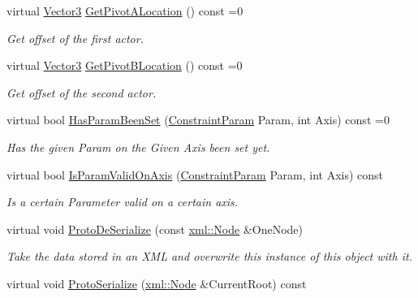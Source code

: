\begin{DoxyCompactItemize}
virtual \hyperlink{classMezzanine_1_1Vector3}{Vector3} \hyperlink{classMezzanine_1_1TypedConstraint_af785319e62e274656f180ab80f5f8dd9}{GetPivotALocation} () const =0
\begin{DoxyCompactList}\small\item\em Get offset of the first actor. \item\end{DoxyCompactList}\item 
virtual \hyperlink{classMezzanine_1_1Vector3}{Vector3} \hyperlink{classMezzanine_1_1TypedConstraint_a2c0984d3211b30756c7ec5263c99b014}{GetPivotBLocation} () const =0
\begin{DoxyCompactList}\small\item\em Get offset of the second actor. \item\end{DoxyCompactList}\item 
virtual bool \hyperlink{classMezzanine_1_1TypedConstraint_a96a6b4c16521f24d72feea98044ef3a8}{HasParamBeenSet} (\hyperlink{namespaceMezzanine_a6c62e8c2938fb203eb7a7072c12176f4}{ConstraintParam} Param, int Axis) const =0
\begin{DoxyCompactList}\small\item\em Has the given Param on the Given Axis been set yet. \item\end{DoxyCompactList}\item 
virtual bool \hyperlink{classMezzanine_1_1TypedConstraint_aeaaffe002055651f3db3e9150fe5a114}{IsParamValidOnAxis} (\hyperlink{namespaceMezzanine_a6c62e8c2938fb203eb7a7072c12176f4}{ConstraintParam} Param, int Axis) const 
\begin{DoxyCompactList}\small\item\em Is a certain Parameter valid on a certain axis. \item\end{DoxyCompactList}\item 
virtual void \hyperlink{classMezzanine_1_1TypedConstraint_a18ea81954d7cc28dce3e5f4c03eac820}{ProtoDeSerialize} (const \hyperlink{classMezzanine_1_1xml_1_1Node}{xml::Node} \&OneNode)
\begin{DoxyCompactList}\small\item\em Take the data stored in an XML and overwrite this instance of this object with it. \item\end{DoxyCompactList}\item 
virtual void \hyperlink{classMezzanine_1_1TypedConstraint_ae9d74e8e14d9e79bb4320603fbf824d6}{ProtoSerialize} (\hyperlink{classMezzanine_1_1xml_1_1Node}{xml::Node} \&CurrentRoot) const 

\end{DoxyCompactItemize}

